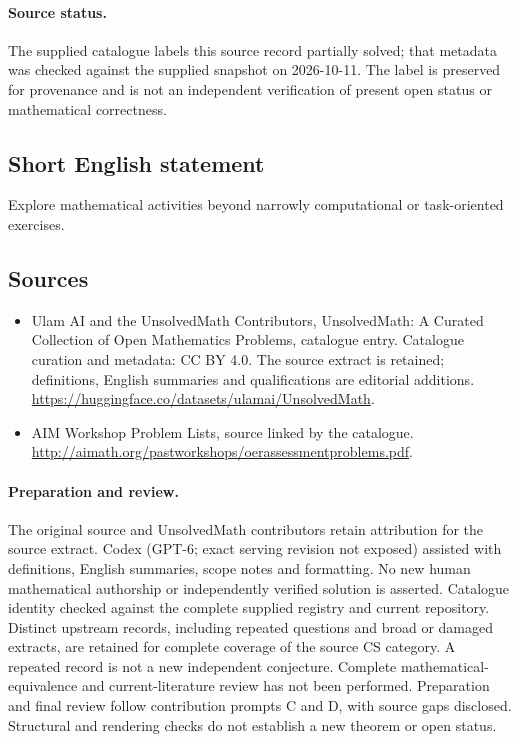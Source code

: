 \documentclass[11pt]{article}
\begin{document}
\paragraph{Source status.}
The supplied catalogue labels this source record partially solved; that metadata was checked against the supplied snapshot on 2026-10-11. The label is preserved for provenance and is not an independent verification of present open status or mathematical correctness.
\subsection{Short English statement}
Explore mathematical activities beyond narrowly computational or task-oriented exercises.
\subsection{Sources}
\begin{itemize}
\item[\hypertarget{source:statement:1}{S1}] Ulam AI and the UnsolvedMath Contributors, UnsolvedMath: A Curated Collection of Open Mathematics Problems, catalogue entry. Catalogue curation and metadata: CC BY 4.0. The source extract is retained; definitions, English summaries and qualifications are editorial additions.
\url{https://huggingface.co/datasets/ulamai/UnsolvedMath}.
\item[\hypertarget{source:statement:2}{S2}] AIM Workshop Problem Lists, source linked by the catalogue.
\url{http://aimath.org/pastworkshops/oerassessmentproblems.pdf}.
\end{itemize}
\paragraph{Preparation and review.}
The original source and UnsolvedMath contributors retain attribution for the source extract. Codex (GPT-6; exact serving revision not exposed) assisted with definitions, English summaries, scope notes and formatting. No new human mathematical authorship or independently verified solution is asserted. Catalogue identity checked against the complete supplied registry and current repository. Distinct upstream records, including repeated questions and broad or damaged extracts, are retained for complete coverage of the source CS category. A repeated record is not a new independent conjecture. Complete mathematical-equivalence and current-literature review has not been performed. Preparation and final review follow contribution prompts C and D, with source gaps disclosed. Structural and rendering checks do not establish a new theorem or open status.
\label{end:statement}
\end{document}
